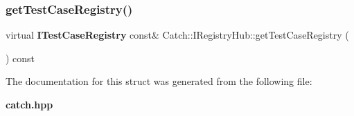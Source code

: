 \subsubsection{get\+Test\+Case\+Registry()}
{\footnotesize\ttfamily virtual \textbf{ I\+Test\+Case\+Registry} const\& Catch\+::\+I\+Registry\+Hub\+::get\+Test\+Case\+Registry (\begin{DoxyParamCaption}{ }\end{DoxyParamCaption}) const\hspace{0.3cm}{\ttfamily [pure virtual]}}



The documentation for this struct was generated from the following file\+:\begin{DoxyCompactItemize}
\item 
\textbf{ catch.\+hpp}\end{DoxyCompactItemize}
